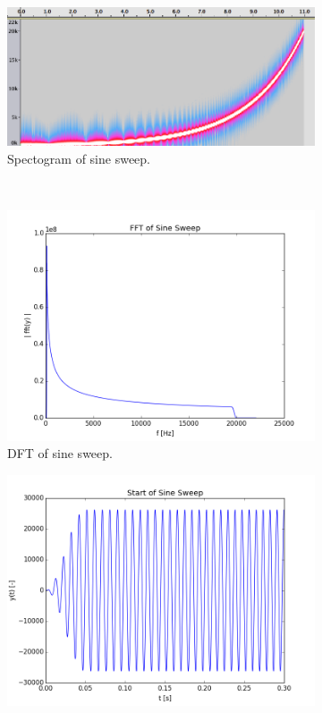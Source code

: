 \begin{figure}[htb]
	\centering		
	\begin{subfigure}[b]{0.7\linewidth}
        \centering
		\includegraphics[width=\linewidth]{files/sweep_spectrogram.png}
        \caption{Spectogram of sine sweep.}
        \label{fig:sweep_spectrogram}
	\end{subfigure} \\
	\begin{subfigure}[b]{0.49\linewidth}
        \centering
		\includegraphics[width=\linewidth]{files/sweep_fft.png}
        \caption{DFT of sine sweep.}
        \label{fig:sweep_fft}
	\end{subfigure}
	\begin{subfigure}[b]{0.49\linewidth}
        \centering
		\includegraphics[width=\linewidth]{files/sweep_start.png}

\end{subfigure}
\end{figure}
